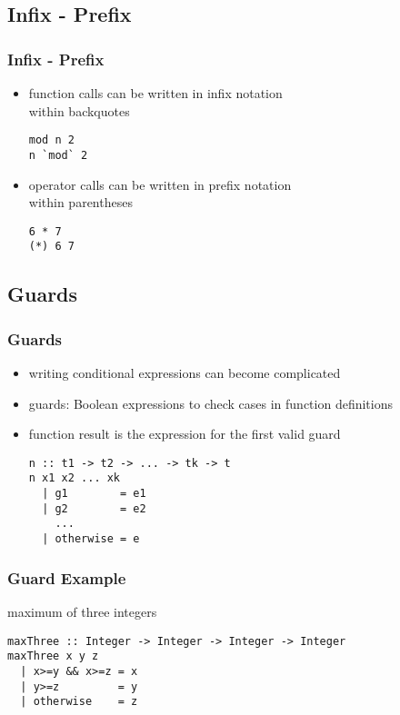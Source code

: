 \documentclass[dvipsnames]{beamer}
\theoremstyle{plain}
\begin{document}
\subsection{Infix - Prefix}

\begin{frame}[fragile]
  \frametitle{Infix - Prefix}

  \begin{itemize}
    \item function calls can be written in infix notation\\
      within backquotes
    \smallskip
    \begin{lstlisting}
mod n 2
n `mod` 2
    \end{lstlisting}

    \pause
    \medskip
    \item operator calls can be written in prefix notation\\
      within parentheses
    \smallskip
    \begin{lstlisting}
6 * 7
(*) 6 7
    \end{lstlisting}
  \end{itemize}
\end{frame}

\subsection{Guards}

\begin{frame}[fragile]
  \frametitle{Guards}

  \begin{itemize}
    \item writing conditional expressions can become complicated
    \item \alert{guards}: Boolean expressions to check cases
      in function definitions
    \item function result is the expression for the first valid guard

    \medskip
    \begin{lstlisting}
n :: t1 -> t2 -> ... -> tk -> t
n x1 x2 ... xk
  | g1        = e1
  | g2        = e2
    ...
  | otherwise = e
    \end{lstlisting}
  \end{itemize}
\end{frame}

\begin{frame}[fragile]
  \frametitle{Guard Example}

  \begin{exampleblock}{maximum of three integers}
    \begin{lstlisting}
maxThree :: Integer -> Integer -> Integer -> Integer
maxThree x y z
  | x>=y && x>=z = x
  | y>=z         = y
  | otherwise    = z
    \end{lstlisting}
  \end{exampleblock}
\end{frame}
\end{document}

